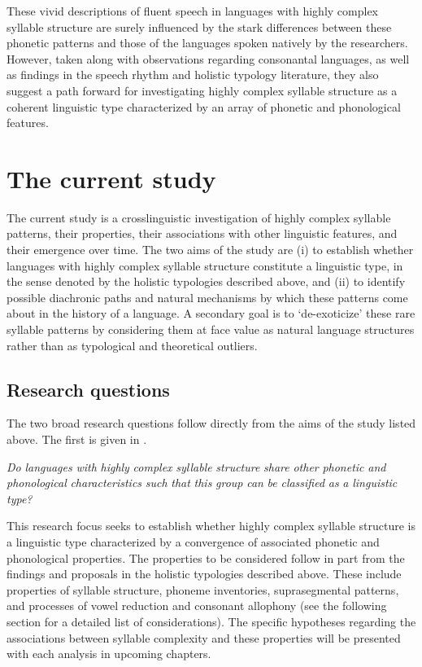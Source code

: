   These vivid descriptions of fluent speech in languages with highly complex syllable structure are surely influenced by the stark differences between these phonetic patterns and those of the languages spoken natively by the researchers. However, taken along with observations regarding consonantal languages, as well as findings in the speech rhythm and holistic typology literature, they also suggest a path forward for investigating highly complex syllable structure as a coherent linguistic type characterized by an array of phonetic and phonological features.

\section{The current study}\label{sec:1.4}

  The current study is a crosslinguistic investigation of highly complex syllable patterns, their properties, their associations with other linguistic features, and their emergence over time. The two aims of the study are (i) to establish whether languages with highly complex syllable structure constitute a linguistic type, in the sense denoted by the holistic typologies described above, and (ii) to identify possible diachronic paths and natural mechanisms by which these patterns come about in the history of a language. A secondary goal is to ‘de-exoticize’ these rare syllable patterns by considering them at face value as natural language structures rather than as typological and theoretical outliers.

\subsection{Research questions}\label{sec:1.4.1}

  The two broad research questions follow directly from the aims of the study listed above. The first is given in .

\ea\label{ex:(1.23)}
   \textit{Do} \textit{languages} \textit{with} \textit{highly} \textit{complex} \textit{syllable} \textit{structure} \textit{share} \textit{other} \textit{phonetic} \textit{and} \textit{phonological} \textit{characteristics} \textit{such} \textit{that} \textit{this} \textit{group} \textit{can} \textit{be} \textit{classified} \textit{as} \textit{a} \textit{linguistic} \textit{type?}
\z

  This research focus seeks to establish whether highly complex syllable structure is a linguistic type characterized by a convergence of associated phonetic and phonological properties. The properties to be considered follow in part from the findings and proposals in the holistic typologies described above. These include properties of syllable structure, phoneme inventories, suprasegmental patterns, and processes of vowel reduction and consonant allophony (see the following section for a detailed list of considerations). The specific hypotheses regarding the associations between syllable complexity and these properties will be presented with each analysis in upcoming chapters.

